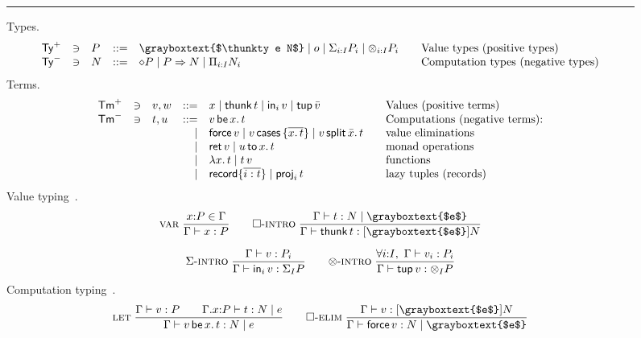 \documentclass[acmsmall,review,anonymous]{acmart}\settopmatter{printfolios=true,printccs=false,printacmref=false}
\newcommand{\dashruler}{\hdashrule[0.5ex]{\textwidth}{0.2pt}{1ex}}
\newcommand{\ruler}{\rule{\textwidth}{0.2pt}}
\newcommand{\graybox}[1]{\grayboxtext{$#1$}}
\begin{document}
\begin{figure}[htbp]
\flushleft
\ruler{}
Types.
\[
\begin{array}{lllrl@{\qquad}l}
\PTy & \ni & P
  & ::= & \graybox{\thunkty e N}
     \mid o \mid \sumty i I P \mid \tupty i I P
  & \mbox{Value types (positive types)} \\
\NTy & \ni & N
  & ::= & \compty P
     \mid P \To N \mid \recty i I N
  & \mbox{Computation types (negative types)} \\
\end{array}
\]
\dashruler{}
Terms.
\[
\begin{array}{lllrl@{\qquad}l}
\PTm & \ni & v,w
  & ::= & x
     \mid \thunk t
     \mid \inj i v
     \mid \ptup{\bar v}
  & \mbox{Values (positive terms)} \\
\NTm & \ni & t,u
  & ::= &
         \vlet x v t
  & \mbox{Computations (negative terms):}
\\ &&& \mid &
        \force v
    \mid \case v {\overline{x.\,t}}
    \mid \splits v {\bar x} t
  & \mbox{value eliminations}
\\ &&& \mid &
         \ret v        \mid \bind x u t
  & \mbox{monad operations}
\\ &&& \mid &
         \lam x t      \mid \app t v
  & \mbox{functions}
\\ &&& \mid &
         \trecord\{\overline{i:t}\} %
       \mid \proj i t
  & \mbox{lazy tuples (records)}
\end{array}
\]
\dashruler{}
Value typing \,.
\begin{gather*}
 \nru{\rvar}
     {x{:}P \in \Gamma
    }{\ValTy \Gamma x P}
\qquad
 \nru{\rintro\Box}
     {\CompTy \Gamma t {\graybox e} N
    }{\ValTy \Gamma {\thunk t} {\thunkty {\graybox e} N}}
\\[1.5ex]
 \nru{\rintro\GS}
     {\ValTy \Gamma v {P_i}
    }{\ValTy \Gamma {\inj i v} {\sumt I P}}
\qquad
 \nru{\rintro\otimes}
     {\forall i{:}I, \ \ValTy \Gamma {v_i} {P_i}
    }{\ValTy \Gamma {\ptup v} {\tupt I P}}
\end{gather*}
\dashruler{}
Computation typing \fbox{$\CompTy \Gamma t {\graybox{e}} N$}\,.
\begin{gather*}
 \nru{\rlet}
     {\ValTy \Gamma v P \qquad
      \CompTy {\ext \Gamma x P} t e N
    }{\CompTy \Gamma {\vlet x v t} e N}
\qquad
 \nru{\relim\Box}
     {\ValTy \Gamma v {\thunkty {\graybox e} N}
    }{\CompTy \Gamma {\force v} {\graybox e} N}

\end{gather*}
\end{figure}
\end{document}
